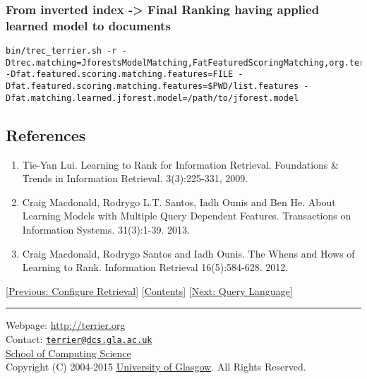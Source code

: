 \subsubsection{From inverted index -\textgreater{} Final Ranking having
applied learned model to
documents}\label{from-inverted-index---final-ranking-having-applied-learned-model-to-documents}

\begin{verbatim}
bin/trec_terrier.sh -r -Dtrec.matching=JforestsModelMatching,FatFeaturedScoringMatching,org.terrier.matching.daat.FatFull -Dfat.featured.scoring.matching.features=FILE -Dfat.featured.scoring.matching.features=$PWD/list.features -Dfat.matching.learned.jforest.model=/path/to/jforest.model
\end{verbatim}

\subsection{References}\label{references}

\begin{enumerate}
\tightlist
\item
  Tie-Yan Lui. Learning to Rank for Information Retrieval. Foundations
  \& Trends in Information Retrieval. 3(3):225-331, 2009.
\item
  Craig Macdonald, Rodrygo L.T. Santos, Iadh Ounis and Ben He. About
  Learning Models with Multiple Query Dependent Features. Transactions
  on Information Systems. 31(3):1-39. 2013.
\item
  Craig Macdonald, Rodrygo Santos and Iadh Ounis. The Whens and Hows of
  Learning to Rank. Information Retrieval 16(5):584-628. 2012.
\end{enumerate}

{[}\href{configure_retrieval.html}{Previous: Configure Retrieval}{]}
{[}\href{index.html}{Contents}{]} {[}\href{querylanguage.html}{Next:
Query Language}{]}

\begin{center}\rule{0.5\linewidth}{\linethickness}\end{center}

Webpage: \url{http://terrier.org}\\
Contact:
\href{mailto:terrier@dcs.gla.ac.uk}{\nolinkurl{terrier@dcs.gla.ac.uk}}\\
\href{http://www.dcs.gla.ac.uk/}{School of Computing Science}\\
Copyright (C) 2004-2015 \href{http://www.gla.ac.uk/}{University of
Glasgow}. All Rights Reserved.

~
